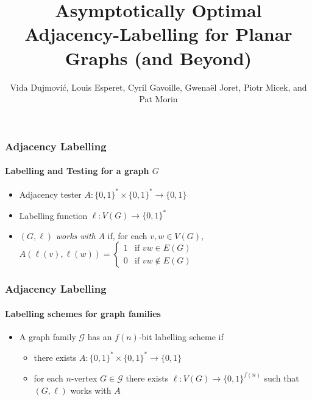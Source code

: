 \documentclass[aspectratio=169,xcolor=dvipsnames]{beamer}
\title[Adjacency Labelling]{Asymptotically Optimal Adjacency-Labelling for Planar Graphs\newline
 (and Beyond)}
\author[Dujmović, Esperet, Gavoille, Joret, Micek, Morin]{Vida Dujmović, Louis Esperet, Cyril Gavoille, Gwenaël Joret, Piotr Micek, and Pat Morin}
\begin{document}
\begin{frame}
  \titlepage
\end{frame}

\begin{frame}
  \frametitle{Adjacency Labelling}
  \framesubtitle{Labelling and Testing for a graph $G$}

  \begin{itemize}
    \item Adjacency tester $A:\{0,1\}^*\times\{0,1\}^*\to \{0,1\}$
    \item Labelling function $\ell:V(G)\to\{0,1\}^*$
    \item $(G,\ell)$ \emph{works with} $A$ if, for each $v,w\in V(G)$,
        $
            A(\ell(v),\ell(w)) = \begin{cases}
                1 & \text{if $vw\in E(G)$} \\
                0 & \text{if $vw\not\in E(G)$}
        \end{cases}
        $
    \end{itemize}
    \begin{center}
    \end{center}
\end{frame}

\begin{frame}
    \frametitle{Adjacency Labelling}
    \framesubtitle{Labelling schemes for graph families}

    \begin{itemize}
        \item<+->A graph family $\mathcal{G}$ has an $f(n)$-bit labelling scheme if \begin{itemize}
            \item there exists $A:\{0,1\}^*\times\{0,1\}^*\to\{0,1\}$
            \item for each $n$-vertex $G\in\mathcal{G}$ there exists $\ell:V(G)\to\{0,1\}^{f(n)}$ such that $(G,\ell)$ works with $A$
        \end{itemize}
    \end{itemize}
    \begin{center}
    \end{center}
\end{frame}
\end{document}
